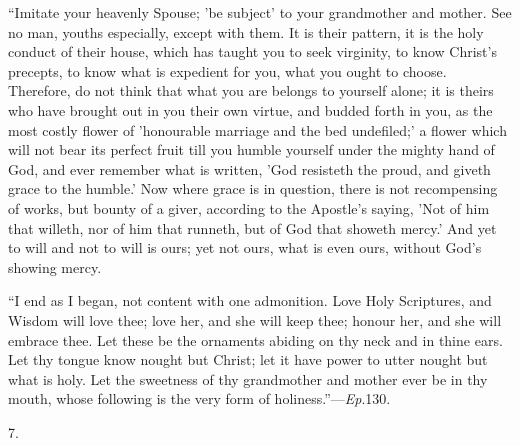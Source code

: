 ``Imitate your heavenly Spouse; 'be subject' to your
grandmother and mother. See no man, youths especially, except with
them. It is their pattern, it is the holy conduct of their house,
which has taught you to seek virginity, to know Christ's precepts, to
know what is expedient for you, what you ought to choose. Therefore,
do not think that what you are belongs to yourself alone; it is theirs
who have brought out in you their own virtue, and budded forth in you,
as the most costly flower of 'honourable marriage and the bed
undefiled;' a flower which will not bear its perfect fruit till you
humble yourself under the mighty hand of God, and ever remember what
is written, 'God resisteth the proud, and giveth grace to the humble.'
Now where grace is in question, there is not recompensing of works,
but bounty of a giver, according to the Apostle's saying, 'Not of him
that willeth, nor of him that runneth, but of God that showeth mercy.'
And yet to will and not to will is ours; yet not ours, what is even
ours, without God's showing mercy.

``I end as I began, not content with one admonition. Love Holy
Scriptures, and Wisdom will love thee; love her, and she will keep
thee; honour her, and she will embrace thee. Let these be the
ornaments abiding on thy neck and in thine ears. Let thy tongue know
nought but Christ; let it have power to utter nought but what is holy.
Let the sweetness of thy grandmother and mother
ever be in thy mouth, whose following is the very form of
holiness.''—\emph{Ep}.130.

7.

